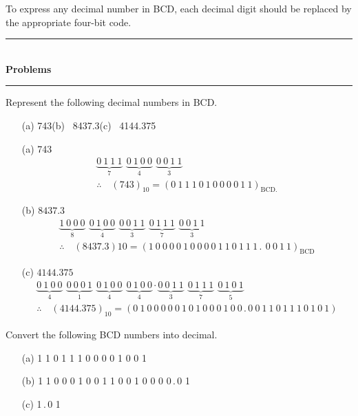 To express any decimal number in BCD, each decimal digit should be replaced by the appropriate four-bit code.

\begin{center}
\rule{4cm}{1pt}\\
{\bf\Large Problems}\\[-3pt]
\rule{4cm}{1pt}
\end{center}

\begin{problem}\label{prob5.45}
Represent the following decimal numbers in BCD.
\begin{itemize}
\item[(a)] 743\qquad (b)~ 8437.3\qquad (c)~ 4144.375
\end{itemize}
\end{problem}

\begin{solution}
\begin{itemize}
\item[(a)] 743
\begin{gather*}
\underbrace{0~1~1~1}_{7} \ \ \underbrace{0~1~0~0}_{4} \ \ \underbrace{0~0~1~1}_{3}\\[4pt]
\therefore\quad (743)_{10}= (0~1~1~1~0~1~0~0~0~0~1~1)_{\text{BCD}.}
\end{gather*}

\item[(b)] $8437.3$
\begin{gather*}
\underbrace{1~0~0~0}_{8} \ \ \underbrace{0~1~0~0}_{4} \ \ \underbrace{0~0~1~1}_{3} \ \ \underbrace{0~1~1~1}_{7} \ \ \underbrace{0~0~1~1}_{3}\\[3pt]
\therefore\quad (8437.3)10 = (1~0~0~0~0~1~0~0~0~0~1~1~0~1~1~1\,.\,~0~0~1~1)_{\text{BCD}}
\end{gather*}

\item[(c)] $4144.375$
\begin{gather*}
\underbrace{0~1~0~0}_{4} \ \ \underbrace{0~0~0~1}_{1} \ \ \underbrace{0~1~0~0}_{4} \ \ \underbrace{0~1~0~0}_{4} \cdot \underbrace{0~0~1~1}_{3} \ \ \underbrace{0~1~1~1}_{7} \ \ \underbrace{0~1~0~1}_{5}\\[4pt]
\therefore\quad (4144.375)_{10} = (0~1~0~0~0~0~0~1~0~1~0~0~0~1~0~0\,.\,0~0~1~1~0~1~1~1~0~1~0~1)
\end{gather*}
\end{itemize}
\end{solution}

\begin{problem}\label{prob5.46}
Convert the following BCD numbers into decimal.
\begin{itemize}
\item[(a)] 1 1 0 1 1 1 0 0 0 0 1 0 0 1

\item[(b)] 1 1 0 0 0 1 0 0 1 1 0 0 1 0 0 0 0\,.\,0 1

\item[(c)] 1\,.\,0 1
\end{itemize}
\end{problem}

